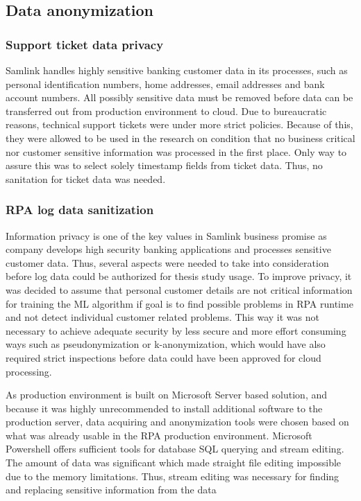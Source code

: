 \subsection{Data anonymization}\label{subsec:meth-data-anonymization}

\subsubsection*{Support ticket data privacy}
Samlink handles highly sensitive banking customer data in its processes,
such as personal identification numbers, home addresses, email addresses and bank account numbers.
All possibly sensitive data must be removed
before data can be transferred out from production environment to cloud.
Due to bureaucratic reasons,
technical support tickets were under more strict policies.
Because of this,
they were allowed to be used in the research
on condition that no business critical nor customer sensitive information
was processed in the first place.
Only way to assure this
was to select solely timestamp fields from ticket data.
Thus, no sanitation for ticket data was needed.

\subsubsection*{RPA log data sanitization}
Information privacy is one of the key values in Samlink business promise
as company develops high security banking applications
and processes sensitive customer data.
Thus, several aspects were needed to take into consideration
before log data could be authorized for thesis study usage.
To improve privacy,
it was decided to assume
that personal customer details are not critical information
for training the ML algorithm
if goal is to find possible problems in RPA runtime
and not detect individual customer related problems.
This way it was not necessary to achieve adequate security
by less secure and more effort consuming ways
such as pseudonymization or k-anonymization,
which would have also required strict inspections
before data could have been approved for cloud processing.

As production environment is built on Microsoft Server based solution,
and because it was highly unrecommended
to install additional software to the production server,
data acquiring and anonymization tools were chosen
based on what was already usable in the RPA production environment.
Microsoft Powershell offers sufficient tools
for database SQL querying
and stream editing.
The amount of data was significant
which made straight file editing impossible
due to the memory limitations.
Thus, stream editing was necessary
for finding and replacing
sensitive information from the data


